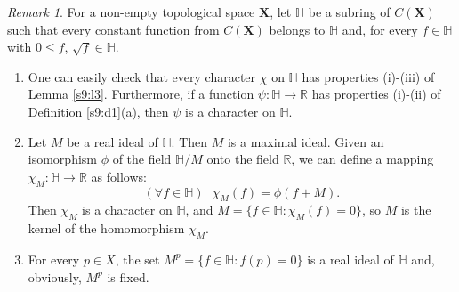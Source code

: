 \documentclass[12pt,twoside,leqno]{article}
\theoremstyle{plain}
\theoremstyle{definition}
\theoremstyle{remark}
\newtheorem{remark}[theorem]{Remark}
\begin{document}
\begin{remark}
	\label{s9:r4} 
	For a non-empty topological space $\mathbf{X}$, let $\mathbb{H}$ be a subring of $C(\mathbf{X})$ such that every constant function from $C(\mathbf{X})$ belongs to $\mathbb{H}$ and, for every $f\in\mathbb{H}$ with $0\leq f$, $\sqrt f\in\mathbb{H}$.
	\begin{enumerate}
		\item[(i)] One can easily check that every character $\chi$ on $\mathbb{H}$ has properties (i)-(iii) of Lemma \ref{s9:l3}. Furthermore, if a function $\psi: \mathbb{H}\to\mathbb{R}$ has properties (i)-(ii) of Definition \ref{s9:d1}(a), then $\psi$ is a character on $\mathbb{H}$. 
		\item[(ii)] Let $M$ be a real ideal of $\mathbb{H}$. Then $M$ is a maximal ideal. Given an isomorphism $\phi$ of the field $\mathbb{H}/M$ onto the field $\mathbb{R}$,  we can define a mapping $\chi_M:\mathbb{H}\to\mathbb{R}$ as follows: 
		$$(\forall f\in\mathbb{H})\text{ } \chi_M(f)=\phi(f+M).$$
		Then $\chi_M$ is a character on $\mathbb{H}$, and $M=\{f\in\mathbb{H}: \chi_M(f)=0\}$, so $M$ is the kernel of the homomorphism $\chi_M$. 
		\item[(iii)] For every $p\in X$, the set $M^p=\{f\in\mathbb{H}: f(p)=0\}$ is a real ideal of $\mathbb{H}$ and, obviously, $M^{p}$ is fixed.
	\end{enumerate}
\end{remark}
\end{document}
